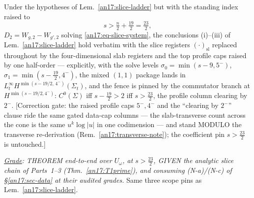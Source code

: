 \begin{lemma}[$N{=}2$ two-slot difference-system energy estimate, locked-4d
register; the mixed $(1,1)$ coincidence value at the rate for
$s>n/2+\tfrac{19}2=\tfrac{23}2$]\label{an17:slice-ladder-4d}
Under the hypotheses of Lem.~\ref{an17:slice-ladder} but with the standing index
raised to
\[
  s>\tfrac n2+\tfrac{19}2=\tfrac{23}2,
\]
$D_2=W_{g,2}-W_{g',2}$ solving \eqref{an17:eq-slice-system}, the conclusions
(i)--(iii) of Lem.~\ref{an17:slice-ladder} hold verbatim with the slice
registers $(\cdot)_{\mathrm{sl}}$ replaced throughout by the four-dimensional
slab registers and the top profile caps raised by one half-order --- explicitly,
with the solve levels $\sigma_0=\min(s-9,5^-)$, $\sigma_1=\min(s-\tfrac{19}2,4^-)$,
the mixed $(1,1)$ package lands in $L^\infty_t H^{\min(s-19/2,\,4^-)}(\Sigma_t)$,
and the fence is pinned by the commutator branch at $H^{\min(s-19/2,4^-)}$:
$C^0(\Sigma)$ iff $s-\tfrac{19}2>2$ iff $s>\tfrac{23}2$, the profile column
clearing by $2^-$. \textup{[Correction gate: the raised profile caps $5^-,4^-$
and the ``clearing by $2^-$'' clause ride the same gated data-cap columns ---
the slab-transverse count across the cone is the same $u^k\log|u|$ in one
codimension --- and stand MODULO the transverse re-derivation
(Rem.~\ref{an17:transverse-note}); the coefficient pin $s>\tfrac{23}2$ is
untouched.]}

\smallskip
\emph{\underline{Grade}: THEOREM end-to-end over $U_\omega$, at $s>\tfrac{23}2$,
GIVEN the analytic slice chain of Parts~1--3 (Thm.~\ref{an17:T1prime}), and
consuming \textup{(N-a)}/\textup{(N-c)} of \S\ref{an17:sec-data} at their
audited grades.} Same three scope pins as Lem.~\ref{an17:slice-ladder}.
\end{lemma}

